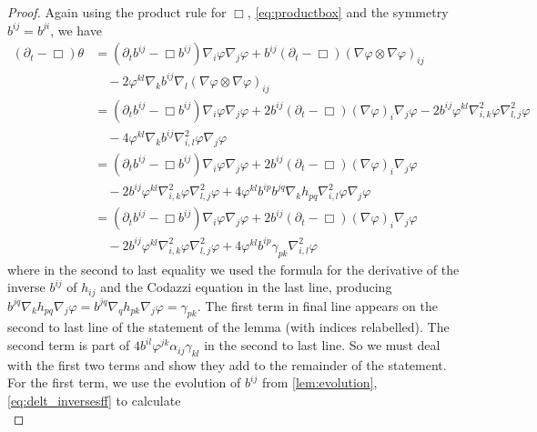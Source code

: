 \documentclass{amsart}
\begin{document}
\begin{proof}
Again using the product rule for \(\Box\), \cref{eq:productbox} and the symmetry \(b^{ij} = b^{ji}\), we have
\begin{equation}
\label{eq:delt_theta}
\begin{split}
(\partial_{t} - \Box)\theta &= (\partial_{t}b^{ij} - \Box b^{ij})\nabla_i \varphi\nabla_j\varphi + b^{ij} (\partial_{t} - \Box) (\nabla\varphi \otimes \nabla\varphi)_{ij} \\
&\quad - 2 \varphi^{kl} \nabla_k b^{ij} \nabla_l (\nabla \varphi \otimes \nabla\varphi)_{ij} \\
&= (\partial_{t}b^{ij} - \Box b^{ij})\nabla_i \varphi\nabla_j\varphi + 2 b^{ij} (\partial_{t} - \Box) (\nabla\varphi)_i \nabla_j\varphi - 2 b^{ij} \varphi^{kl} \nabla^2_{i,k} \varphi \nabla^2_{l,j} \varphi \\
&\quad - 4 \varphi^{kl} \nabla_k b^{ij} \nabla^2_{i,l} \varphi \nabla_j\varphi \\
&= (\partial_{t}b^{ij} - \Box b^{ij})\nabla_i \varphi\nabla_j\varphi + 2 b^{ij} (\partial_{t} - \Box) (\nabla\varphi)_i \nabla_j\varphi \\
&\quad - 2 b^{ij} \varphi^{kl} \nabla^2_{i,k} \varphi \nabla^2_{l,j} \varphi + 4 \varphi^{kl} b^{ip}b^{jq} \nabla_k h_{pq} \nabla^2_{i,l} \varphi \nabla_j\varphi \\
&= (\partial_{t}b^{ij} - \Box b^{ij})\nabla_i \varphi\nabla_j\varphi + 2 b^{ij} (\partial_{t} - \Box) (\nabla\varphi)_i \nabla_j\varphi \\ 
&\quad - 2 b^{ij} \varphi^{kl} \nabla^2_{i,k} \varphi \nabla^2_{l,j} \varphi + 4 \varphi^{kl} b^{ip}\gamma_{pk} \nabla^2_{i,l} \varphi
\end{split}
\end{equation}
where in the second to last equality we used the formula for the derivative of the inverse \(b^{ij}\) of \(h_{ij}\) and the Codazzi equation in the last line, producing \(b^{jq} \nabla_k h_{pq} \nabla_j \varphi = b^{jq} \nabla_q h_{pk} \nabla_j \varphi = \gamma_{pk}\). The first term in final line appears on the second to last line of the statement of the lemma (with indices relabelled). The second term is part of \(4 b^{il}\varphi^{jk} \alpha_{ij} \gamma_{kl}\) in the second to last line. So we must deal with the first two terms and show they add to the remainder of the statement. For the first term, we use the evolution of \(b^{ij}\) from \cref{lem:evolution}, \cref{eq:delt_inversesff} to calculate
\begin{equation}
\label{eq:delt_theta1}

\end{equation}
\end{proof}
\end{document}
